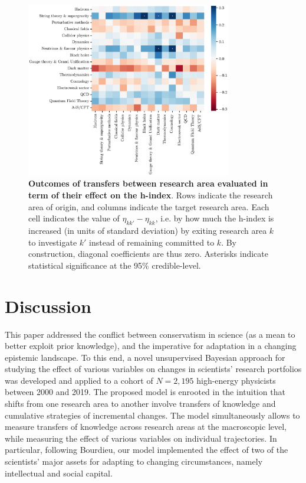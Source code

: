 \documentclass{article}
\begin{document}
\begin{figure}[h]
    \centering
    \includegraphics[width=0.8\textwidth]{plots/outcomes_rho.eps}
    \caption{\textbf{Outcomes of transfers between research area evaluated in term of their effect on the h-index}. Rows indicate the research area of origin, and columns indicate the target research area. Each cell indicates the value of $\eta_{kk'}-\eta_{kk}$, i.e. by how much the h-index is increased (in units of standard deviation) by exiting research area $k$ to investigate $k'$ instead of remaining committed to $k$. By construction, diagonal coefficients are thus zero. Asterisks indicate statistical significance at the 95\% credible-level. }
    \label{fig:outcomes_rho}
\end{figure}



\section{Discussion}

This paper addressed the conflict between conservatism in science (as a mean to better exploit prior knowledge), and the imperative for adaptation in a changing epistemic landscape. To this end, a novel unsupervised Bayesian approach for studying the effect of various variables on changes in scientists' research portfolios was developed and applied to a cohort of $N=2,195$ high-energy physicists between 2000 and 2019. The proposed model is enrooted in the intuition that shifts from one research area to another involve transfers of knowledge and cumulative strategies of incremental changes. The model simultaneously allows to measure transfers of knowledge across research areas at the macroscopic level, while measuring the effect of various variables on individual trajectories. In particular, following Bourdieu, our model implemented the effect of two of the scientists' major assets for adapting to changing circumstances, namely intellectual and social capital.
\end{document}
